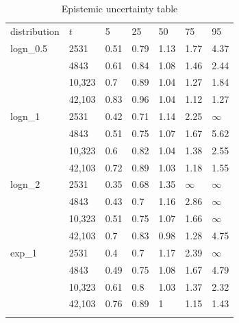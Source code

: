 \documentclass[se, manuscript]{copernicus}
\begin{document}
\begin{table}[t]
\begin{tabular}{lllllll}
\tophline
distribution  &  $t$     &     5  &     25 &     50 &    75 &   95 \\
\middlehline
logn\_0.5 & 2531  &  0.51 &  0.79 &  1.13 &  1.77 &  4.37 \\
      & 4843  &  0.61 &  0.84 &  1.08 &  1.46 &  2.44 \\
      & 10,323 &   0.7 &  0.89 &  1.04 &  1.27 &  1.84 \\
      & 42,103 &  0.83 &  0.96 &  1.04 &  1.12 &  1.27 \\
logn\_1 & 2531  &  0.42 &  0.71 &  1.14 &  2.25 &   $\infty$ \\
      & 4843  &  0.51 &  0.75 &  1.07 &  1.67 &  5.62 \\
      & 10,323 &   0.6 &  0.82 &  1.04 &  1.38 &  2.55 \\
      & 42,103 &  0.72 &  0.89 &  1.03 &  1.18 &  1.55 \\
logn\_2 & 2531  &  0.35 &  0.68 &  1.35 &   $\infty$ &   $\infty$ \\
      & 4843  &  0.43 &   0.7 &  1.16 &  2.86 &   $\infty$ \\
      & 10,323 &  0.51 &  0.75 &  1.07 &  1.66 &   $\infty$ \\
      & 42,103 &   0.7 &  0.83 &  0.98 &  1.28 &  4.75 \\
exp\_1 & 2531  &   0.4 &   0.7 &  1.17 &  2.39 &   $\infty$ \\
      & 4843  &  0.49 &  0.75 &  1.08 &  1.67 &  4.79 \\
      & 10,323 &  0.61 &   0.8 &  1.03 &  1.37 &  2.32 \\
      & 42,103 &  0.76 &  0.89 &     1 &  1.15 &  1.43 \\
 \bottomhline
\end{tabular}
  \caption{Epistemic uncertainty table \label{ep_unc_table}}
\end{table}
\end{document}
